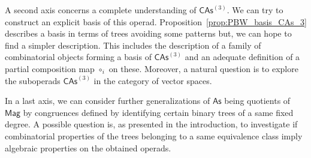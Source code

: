 \documentclass[10pt,reqno]{amsart}
\numberwithin{equation}{subsection}
\newcommand{\Mag}{\mathsf{Mag}}
\newcommand{\As}{\mathsf{As}}
\newcommand{\CAs}[1]{\mathsf{CAs}^{(#1)}}
\begin{document}
A second axis concerns a complete understanding of $\CAs{3}$. We can
try to construct an explicit basis of this operad.
Proposition~\ref{prop:PBW_basis_CAs_3} describes a basis in terms of
trees avoiding some patterns but, we can hope to find a simpler
description. This includes the description of a family of combinatorial
objects forming a basis of $\CAs{3}$ and an adequate definition of a
partial composition map $\circ_i$ on these. Moreover, a natural
question is to explore the suboperads $\CAs{3}$ in the category of
vector spaces.

In a last axis, we can consider further generalizations of $\As$ being
quotients of $\Mag$ by congruences defined by identifying certain binary
trees of a same fixed degree. A possible question is, as presented in
the introduction, to investigate if combinatorial properties of the
trees belonging to a same equivalence class imply algebraic properties
on the obtained operads.



\end{document}
